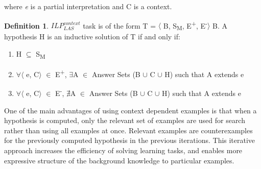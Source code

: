 \documentclass[11pt,twoside]{report}
\theoremstyle{plain}
\theoremstyle{definition}
\newtheorem{defn}[thm]{Definition} %
\begin{document}
where \textit{e} is a partial interpretation and C is a context.

%
\begin{defn} \label{def:las_context}
$ILP_{LAS}^{context}$ task is of the form T = $\langle$ B, S\textsubscript{M}, E\textsuperscript{+}, E\textsuperscript{-}$\rangle$ B.
A hypothesis H is an inductive solution of T if and only if:
\begin{enumerate}
\item H $\subseteq$ S\textsubscript{M}
\item $\forall$$\langle$ e, C$\rangle$ $\in$ E\textsuperscript{+}, $\exists$A $\in$ Answer Sets (B $\cup$ C $\cup$ H) such that A extends e
\item $\forall$$\langle$ e, C$\rangle$ $\in$ E\textsuperscript{-}, $\nexists$A $\in$ Answer Sets (B $\cup$ C $\cup$ H) such that A extends e
\end{enumerate}
\end{defn}
One of the main advantages of using context dependent examples is that when a hypothesis is computed, only the relevant set of examples are used for search rather than using all examples at once. 
Relevant examples are counterexamples for the previously computed hypothesis in the previous iterations. This iterative approach increases the efficiency of solving learning tasks, and enables more expressive structure of the background knowledge to particular examples. 
\end{document}
